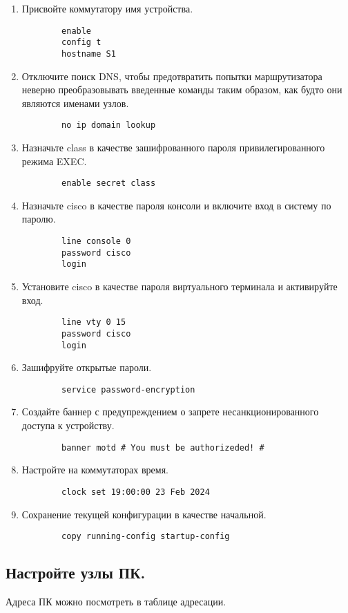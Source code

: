 \begin{enumerate}[a]
    \item Присвойте коммутатору имя устройства.
    \begin{verbatim}
        enable
        config t
        hostname S1
    \end{verbatim}

    \item Отключите поиск DNS, чтобы предотвратить попытки маршрутизатора неверно преобразовывать
    введенные команды таким образом, как будто они являются именами узлов.
    \begin{verbatim}
        no ip domain lookup
    \end{verbatim}

    \item Назначьте class в качестве зашифрованного пароля привилегированного режима EXEC\@.
    \begin{verbatim}
        enable secret class
    \end{verbatim}

    \item Назначьте cisco в качестве пароля консоли и включите вход в систему по паролю.
    \begin{verbatim}
        line console 0
        password cisco
        login
    \end{verbatim}

    \item Установите cisco в качестве пароля виртуального терминала и активируйте вход.
    \begin{verbatim}
        line vty 0 15
        password cisco
        login
    \end{verbatim}

    \item Зашифруйте открытые пароли.
    \begin{verbatim}
        service password-encryption
    \end{verbatim}

    \item Создайте баннер с предупреждением о запрете несанкционированного доступа к устройству.
    \begin{verbatim}
        banner motd # You must be authorizeded! #
    \end{verbatim}

    \item Настройте на коммутаторах время.
    \begin{verbatim}
        clock set 19:00:00 23 Feb 2024
    \end{verbatim}

    \item Сохранение текущей конфигурации в качестве начальной.
    \begin{verbatim}
        copy running-config startup-config
    \end{verbatim}
\end{enumerate}


\subsection{Настройте узлы ПК.}
Адреса ПК можно посмотреть в таблице адресации.
